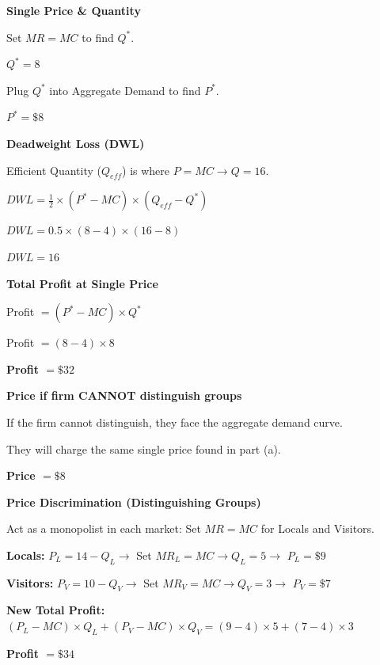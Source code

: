 \documentclass[12pt]{article}
\begin{document}
\begin{subqs}

\item \textbf{Single Price \& Quantity}
  \begin{solbullets}
    \item Set $MR = MC$ to find $Q^*$.
    \item \textbf{$Q^* = 8$}
    \item Plug $Q^*$ into Aggregate Demand to find $P^*$.
    \item \textbf{$P^* = \$8$}
  \end{solbullets}

\item \textbf{Deadweight Loss (DWL)}
  \begin{solbullets}
    \item Efficient Quantity ($Q_{eff}$) is where $P = MC \rightarrow Q = 16$.
    \item $DWL = \frac{1}{2} \times (P^* - MC) \times (Q_{eff} - Q^*)$
    \item $DWL = 0.5 \times (8 - 4) \times (16 - 8)$
    \item \textbf{$DWL = 16$}
  \end{solbullets}

\item \textbf{Total Profit at Single Price}
  \begin{solbullets}
    \item Profit $= (P^* - MC) \times Q^*$
    \item Profit $= (8 - 4) \times 8$
    \item \textbf{Profit $= \$32$}
  \end{solbullets}

\item \textbf{Price if firm CANNOT distinguish groups}
  \begin{solbullets}
    \item If the firm cannot distinguish, they face the aggregate demand curve.
    \item They will charge the same single price found in part (a).
    \item \textbf{Price $= \$8$}
  \end{solbullets}

\item \textbf{Price Discrimination (Distinguishing Groups)}
  \begin{solbullets}
    \item Act as a monopolist in each market: Set $MR = MC$ for Locals and Visitors.
    \item \textbf{Locals:} $P_L = 14 - Q_L \rightarrow$ Set $MR_L = MC \rightarrow Q_L = 5 \rightarrow$ \textbf{$P_L = \$9$}
    \item \textbf{Visitors:} $P_V = 10 - Q_V \rightarrow$ Set $MR_V = MC \rightarrow Q_V = 3 \rightarrow$ \textbf{$P_V = \$7$}
    \item \textbf{New Total Profit:} $(P_L - MC) \times Q_L + (P_V - MC) \times Q_V = (9 - 4) \times 5 + (7 - 4) \times 3$
    \item \textbf{Profit $= \$34$}
  \end{solbullets}


\end{subqs}
\end{document}
